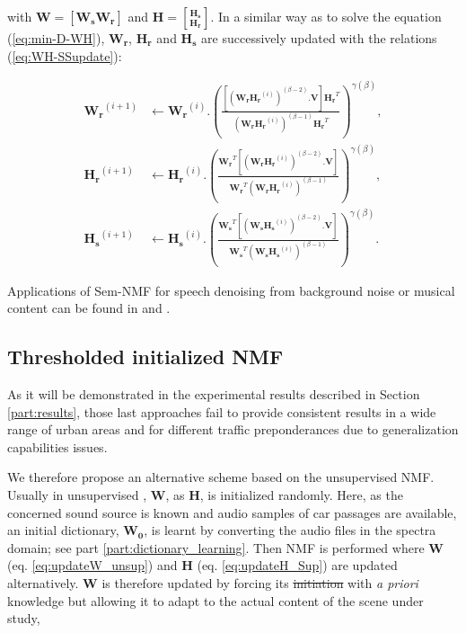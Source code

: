 \documentclass[twocolumn]{svjour3}          %
\providecommand{\DIFaddtex}[1]{{\protect\color{blue}\uwave{#1}}} %
\providecommand{\DIFdeltex}[1]{{\protect\color{red}\sout{#1}}}                      %
\providecommand{\DIFaddbegin}{} %
\providecommand{\DIFaddend}{} %
\providecommand{\DIFdelbegin}{} %
\providecommand{\DIFdelend}{} %
\providecommand{\DIFadd}[1]{\texorpdfstring{\DIFaddtex{#1}}{#1}} %
\providecommand{\DIFdel}[1]{\texorpdfstring{\DIFdeltex{#1}}{}} %
\begin{document}
 with $\mathbf{W} = \left[\mathbf{W_s} \mathbf{W_r} \right]$ and $\mathbf{H} = \genfrac[]{0pt}{0}{\mathbf{H_s}}{\mathbf{H_r}}$. In a similar way as to solve the equation (\ref{eq:min-D-WH}), $\mathbf{W_r}$, $\mathbf{H_r}$ and $\mathbf{H_s}$ are successively updated with the relations (\ref{eq:WH-SSupdate}):

{\scriptsize
\begin{subequations}\label{eq:WH-SSupdate}
\begin{align}
\mathbf{W_r}^{(i+1)} &\leftarrow \mathbf{W_r}^{(i)}.\left(\frac{\left[\left(\mathbf{W_r H_r}^{(i)} \right)^{(\beta-2)}.\mathbf{V} \right]\mathbf{H_r}^T}{\left(\mathbf{W_r H_r}^{(i)} \right)^{(\beta-1)}\mathbf{H_r}^T}\right)^{\gamma(\beta)}, \label{eq:W_r_SS}\\
\mathbf{H_r}^{(i+1)} &\leftarrow \mathbf{H_r}^{(i)}.\left(\frac{\mathbf{W_r}^T \left[\left(\mathbf{W_r H_r}^{(i)} \right)^{(\beta-2)}.\mathbf{V} \right]}{\mathbf{W_r}^T \left(\mathbf{W_r H_r}^{(i)} \right)^{(\beta-1)}}\right)^{\gamma(\beta)}, \label{eq:H_r_SS}\\
\mathbf{H_s}^{(i+1)} &\leftarrow \mathbf{H_s}^{(i)}.\left(\frac{\mathbf{W_s}^T \left[\left(\mathbf{W_s H_s}^{(i)} \right)^{(\beta-2)}.\mathbf{V} \right]}{\mathbf{W_s}^T \left(\mathbf{W_s H_s}^{(i)} \right)^{(\beta-1)}}\right)^{\gamma(\beta)}.\label{eq:H_s_SS}
\end{align}
\end{subequations}}

Applications of Sem-NMF for speech denoising from background noise or musical content can be found in \cite{joder2012real} and \cite{weninger2012supervised}.

\subsection{Thresholded initialized NMF}

As it will be demonstrated in the experimental results described in Section \ref{part:results}, those last approaches fail to provide consistent results in a wide range of urban areas and for different traffic preponderances due to generalization capabilities issues.

We therefore propose an alternative scheme based on the unsupervised NMF. Usually in unsupervised \DIFaddbegin \DIFadd{learning}\DIFaddend , $\mathbf{W}$, as  $\mathbf{H}$, is initialized randomly. Here, as the concerned sound source is known and audio samples of car passages are available, an initial dictionary, $\mathbf{W_0}$, is learnt by converting the audio files in the spectra domain; see part \ref{part:dictionary_learning}. Then NMF is performed where $\mathbf{W}$ (eq. \ref{eq:updateW_unsup}) and $\mathbf{H}$ (eq.  \ref{eq:updateH_Sup}) are updated alternatively. $\mathbf{W}$ is therefore updated by forcing its \DIFdelbegin \DIFdel{initiation }\DIFdelend \DIFaddbegin \DIFadd{initialization }\DIFaddend with \textit{a priori} knowledge but allowing it to adapt to the actual content of the scene under study,
\end{document}
